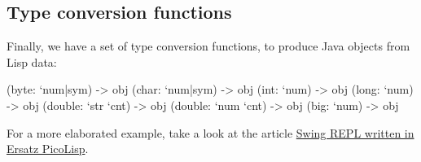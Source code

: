 \subsection{Type conversion functions}
\label{sec:ersatz-java-reflection-type-conversion-functions}

Finally, we have a set of type conversion functions, to produce Java
objects from Lisp data:

\begin{wideverbatim}
(byte: `num|sym) -> obj
(char: `num|sym) -> obj
(int: `num) -> obj
(long: `num) -> obj
(double: `str `cnt) -> obj
(double: `num `cnt) -> obj
(big: `num) -> obj
\end{wideverbatim}

For a more elaborated example, take a look at the article
\hyperref[wiki-SwingRepl]{Swing REPL written in Ersatz PicoLisp}.

